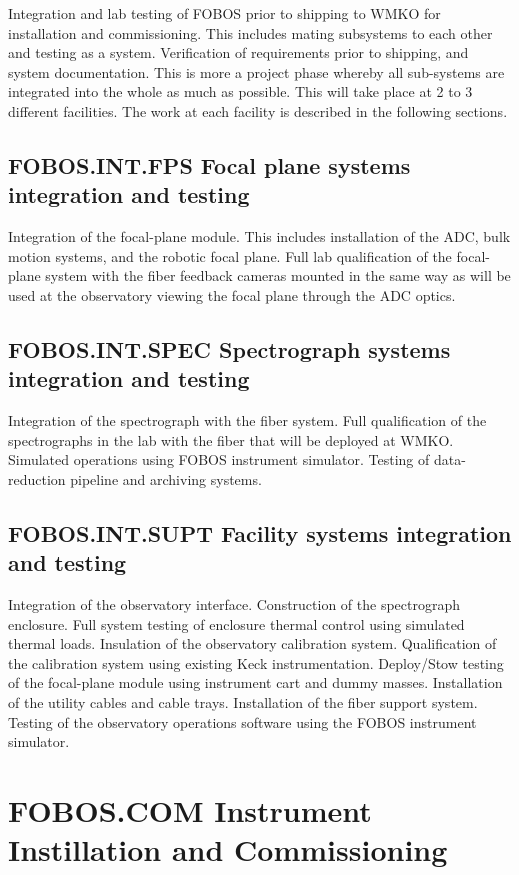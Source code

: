 \documentclass[oneside,11pt]{amsart}
\begin{document}
Integration and lab testing of FOBOS prior to shipping to WMKO for
installation and commissioning. This includes mating subsystems to
each other and testing as a system. Verification of requirements
prior to shipping, and system documentation. This is more a project
phase whereby all sub-systems are integrated into the whole as much
as possible. This will take place at 2 to 3 different facilities. The
work at each facility is described in the following sections.

\subsection{FOBOS.INT.FPS Focal plane systems integration and testing}

Integration of the focal-plane module. This includes installation of
the ADC, bulk motion systems, and the robotic focal plane. Full lab
qualification of the focal-plane system with the fiber feedback
cameras mounted in the same way as will be used at the observatory
viewing the focal plane through the ADC optics.

\subsection{FOBOS.INT.SPEC Spectrograph systems integration and testing}

Integration of the spectrograph with the fiber system. Full
qualification of the spectrographs in the lab with the fiber that will
be deployed at WMKO. Simulated operations using FOBOS instrument
simulator. Testing of data-reduction pipeline and archiving systems.

\subsection{FOBOS.INT.SUPT Facility systems integration and testing}

Integration of the observatory interface. Construction of the
spectrograph enclosure. Full system testing of enclosure thermal
control using simulated thermal loads. Insulation of the observatory
calibration system. Qualification of the calibration system using
existing Keck instrumentation. Deploy/Stow testing of the focal-plane
module using instrument cart and dummy masses. Installation of the
utility cables and cable trays. Installation of the fiber support
system. Testing of the observatory operations software using the
FOBOS instrument simulator.

\section{FOBOS.COM Instrument Instillation and Commissioning}
\end{document}
